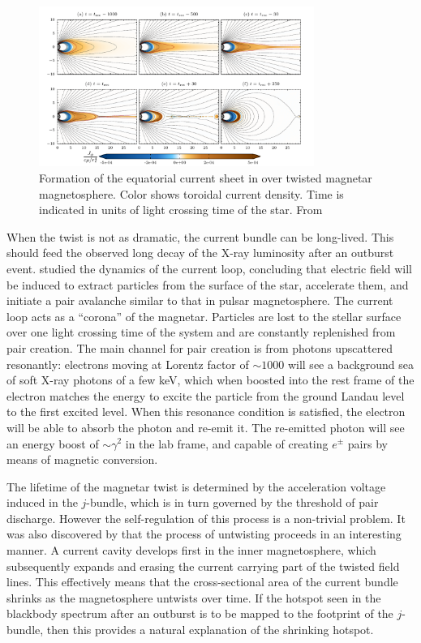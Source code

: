 \begin{figure}[h]
  \centering
  \includegraphics[width=0.8\textwidth]{pics/intro/ffe-giant-flare.png}
  \caption[Formation of the equatorial current sheet in over twisted magnetar
    magnetosphere.]{Formation of the equatorial current sheet in over twisted magnetar
    magnetosphere. Color shows toroidal current density. Time is indicated in
    units of light crossing time of the star. From \citep{parfrey_dynamics_2013}}
  \label{fig:overtwisted-magnetar}
\end{figure}

When the twist is not as dramatic, the current bundle can be long-lived. This
should feed the observed long decay of the X-ray luminosity after an outburst
event. \citet{beloborodov_corona_2007} studied the dynamics of the current loop,
concluding that electric field will be induced to extract particles from the
surface of the star, accelerate them, and initiate a pair avalanche similar to
that in pulsar magnetosphere. The current loop acts as a ``corona'' of the
magnetar. Particles are lost to the stellar surface over one light crossing time
of the system and are constantly replenished from pair creation. The main
channel for pair creation is from photons upscattered resonantly: electrons
moving at Lorentz factor of $\sim 1000$ will see a background sea of soft X-ray
photons of a few keV, which when boosted into the rest frame of the electron
matches the energy to excite the particle from the ground Landau level to the
first excited level. When this resonance condition is satisfied, the electron
will be able to absorb the photon and re-emit it. The re-emitted photon will see
an energy boost of $\sim \gamma^{2}$ in the lab frame, and capable of creating
$e^{\pm}$ pairs by means of magnetic conversion.

The lifetime of the magnetar twist is determined by the acceleration voltage
induced in the $j$-bundle, which is in turn governed by the threshold of pair
discharge. However the self-regulation of this process is a non-trivial problem.
It was also discovered by \citet{beloborodov_untwisting_2009} that the process
of untwisting proceeds in an interesting manner. A current cavity develops first
in the inner magnetosphere, which subsequently expands and erasing the current
carrying part of the twisted field lines. This effectively means that the
cross-sectional area of the current bundle shrinks as the magnetosphere untwists
over time. If the hotspot seen in the blackbody spectrum after an outburst is to
be mapped to the footprint of the $j$-bundle, then this provides a natural
explanation of the shrinking hotspot.

